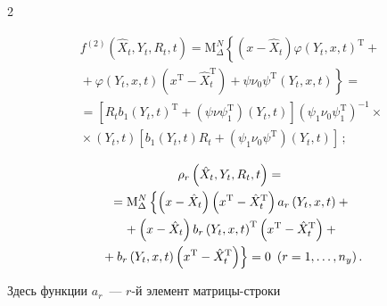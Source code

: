 \begin{multicols}{2}
\noindent

\begin{multline*}

   \!\!f^{(2)}\left(\hat X_t, Y_t,R_t,t\right)=

   \mathrm{M}^N_\Delta \left\{  \left(x-\hat{X}_t\right)\varphi\left(Y_t,x,t\right)^{\mathrm{T}} + {}\right.\\

\left.   {}+\varphi \left(Y_t,x,t\right) \left(x^{\mathrm{T}}-\hat{X}_t^{\mathrm{T}}\right) +\psi\nu_0\psi^{\mathrm{T}} \left(Y_t,x,t\right)\right\}={}\\

{}=\left[ R_t b_1 \left(Y_t, t\right)^{\mathrm{T}} + \left(\psi\nu\psi_1^{\mathrm{T}}\right)\left(Y_t, t\right)\right] \left(\psi_1\nu_0\psi_1^{\mathrm{T}}\right)^{-1}\times{}\\

 {}\times \left(Y_t, t\right) \left[ b_1 (Y_t, t) R_t + \left(\psi_1\nu_0\psi^{\mathrm{T}}\right)\left(Y_t, t\right)\right]\,;


\end{multline*}



\vspace*{-12pt}



\noindent

\begin{multline*}

   \rho_r\left(\hat{X}_t,Y_t, R_t,t\right)={}\\

   {}=\mathrm{M}^N_\Delta \left\{  \left(x-\hat X_t\right)\left(x^{\mathrm{T}}-\hat X_t^{\mathrm{T}}\right) a_r \left(Y_t,x,t\right)+{}\right.\\

{}+ \left(x-\hat X_t\right) b_r\left(Y_t,x,t\right)^{\mathrm{T}} \left(x^{\mathrm{T}}-\hat X_t^{\mathrm{T}}\right)+{}\\

 \left.{}+b_r \left(Y_t,x,t\right) \left(x^{\mathrm{T}}-\hat{X}_t^{\mathrm{T}}\right)\right\} =0 \enskip (r=1, \ldots, n_y)\,.


\end{multline*}

Здесь функции  $a_r$~--- $r$-й элемент мат\-ри\-цы-стро\-ки

$$


\end{multicols}
